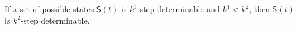 \begin{lemma}
 If a set of possible states $\mathsf{S}(t)$ is $k^1$-step determinable and $k^1< k^2$, then $\mathsf{S}(t)$ is $k^2$-step determinable. %
  \label{lemm:2}
\end{lemma}

